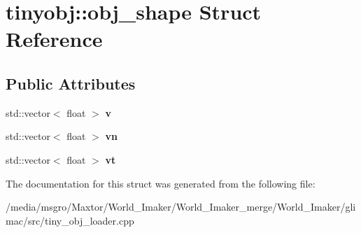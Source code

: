 \hypertarget{structtinyobj_1_1obj__shape}{}\section{tinyobj\+:\+:obj\+\_\+shape Struct Reference}
\label{structtinyobj_1_1obj__shape}
\subsection*{Public Attributes}
\begin{DoxyCompactItemize}
\item 
\mbox{\label{structtinyobj_1_1obj__shape_ad088c2525809a91953fca51798f64b89}} 
std\+::vector$<$ float $>$ {\bfseries v}
\item 
\mbox{\label{structtinyobj_1_1obj__shape_ac87ced8cdff16da62a202bd390e77a8e}} 
std\+::vector$<$ float $>$ {\bfseries vn}
\item 
\mbox{\label{structtinyobj_1_1obj__shape_a2d6dcc97e66ca2596dd50236c899b456}} 
std\+::vector$<$ float $>$ {\bfseries vt}
\end{DoxyCompactItemize}


The documentation for this struct was generated from the following file\+:\begin{DoxyCompactItemize}
\item 
/media/msgro/\+Maxtor/\+World\+\_\+\+Imaker/\+World\+\_\+\+Imaker\+\_\+merge/\+World\+\_\+\+Imaker/glimac/src/tiny\+\_\+obj\+\_\+loader.\+cpp\end{DoxyCompactItemize}
